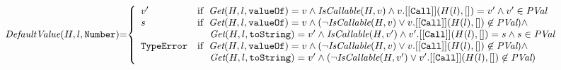 \documentclass[a4paper, leqno]{amsart}
\newcommand{\te}{{\tt TypeError}}
\newcommand{\pval}{\emph{PVal}}
\newcommand{\hf}[1]{\emph{#1}}
\newcommand{\ifc}[1]{{\rm if}\begin{array}[t]{l}#1\end{array}}
\begin{document}
\[\begin{array}{l@{}c@{}l}
\hf{DefaultValue}(H,l,{\tt Number}) &=&
\left\{\begin{array}{ll}
v'   & \ifc{\hf{Get}(H,l,{\tt valueOf}) = v \wedge
\hf{IsCallable}(H,v) \wedge
v.{\tt[[Call]]}(H(l), []) = v' \wedge
v'\in\pval} \\
s & \ifc{\hf{Get}(H,l,{\tt valueOf}) = v \wedge
(\neg \hf{IsCallable}(H,v) \vee
v.{\tt[[Call]]}(H(l), []) \not\in\pval) \wedge} \\
& \mbox{\phantom{if \ }$
\hf{Get}(H,l,{\tt toString}) = v' \wedge
\hf{IsCallable}(H,v') \wedge
v'.{\tt[[Call]]}(H(l), []) = s \wedge
s\in\pval$}\\
\te & \ifc{\hf{Get}(H,l,{\tt valueOf}) = v \wedge
(\neg \hf{IsCallable}(H,v) \vee
v.{\tt[[Call]]}(H(l), []) \not\in\pval) \wedge} \\
& \mbox{\phantom{if \ }$
\hf{Get}(H,l,{\tt toString}) = v' \wedge
(\neg \hf{IsCallable}(H,v') \vee
v'.{\tt[[Call]]}(H(l), []) \not\in\pval)$}
\end{array}\right.
\end{array}
\]
\end{document}
